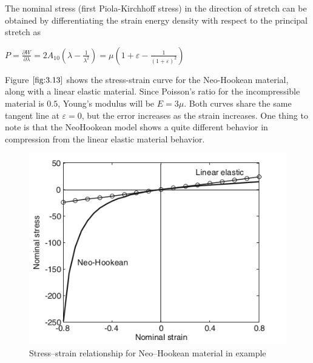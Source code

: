 The nominal stress (first Piola-Kirchhoff stress) in the direction of stretch can be obtained by differentiating the strain energy density with respect to the principal stretch as

$ P=\frac{\partial W}{\partial \lambda}=2 A_{10}\left(\lambda-\frac{1}{\lambda^{2}}\right)=\mu\left(1+\varepsilon-\frac{1}{(1+\varepsilon)^{2}}\right) $

Figure $ \ref{fig:3.13} $ shows the stress-strain curve for the Neo-Hookean material, along with a linear elastic material. Since Poisson's ratio for the incompressible material is $ 0.5 $, Young's modulus will be $ E=3 \mu $. Both curves share the same tangent line at $ \varepsilon=0 $, but the error increases as the strain increases. One thing to note is that the NeoHookean model shows a quite different behavior in compression from the linear elastic material behavior.

\begin{figure}[H]
    \centering
    \includegraphics[scale=0.7]{Figure2/Chap3/neohk.png}
    \caption{Stress–strain relationship for Neo–Hookean material in example}
    \label{fig:3.13}
\end{figure}

